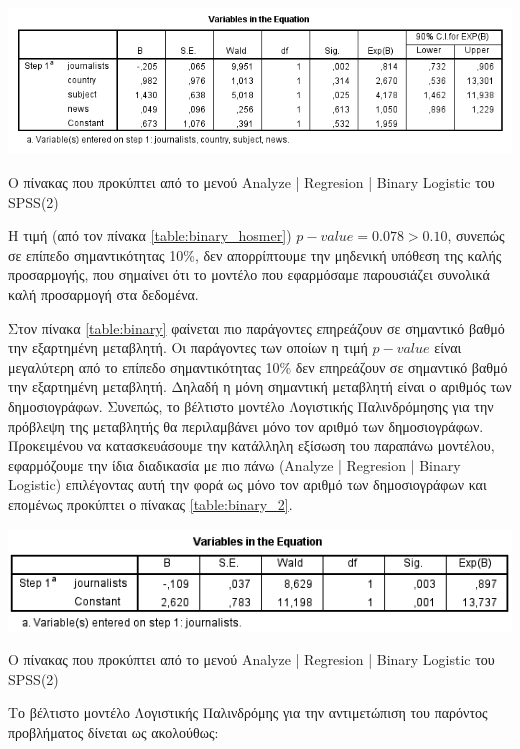 \documentclass{assignment}
\begin{document}
\begin{Assignment}[Μέρος Ε]
\begin{table}[htbp]
\includegraphics[width=\textwidth]{images/table_binary.png}
\caption{Ο πίνακας που προκύπτει από το μενού Analyze | Regresion | Binary Logistic του SPSS(2) }
\label{table:binary}
\end{table}

Η τιμή (από τον πίνακα \ref{table:binary_hosmer}) $p-value = 0.078 > 0.10$, συνεπώς σε επίπεδο σημαντικότητας 10\%, δεν απορρίπτουμε την μηδενική υπόθεση της καλής προσαρμογής, που σημαίνει ότι το μοντέλο που εφαρμόσαμε παρουσιάζει συνολικά καλή προσαρμογή στα δεδομένα.

Στον πίνακα \ref{table:binary} φαίνεται πιο παράγοντες επηρεάζουν σε σημαντικό βαθμό την εξαρτημένη μεταβλητή. Οι παράγοντες των οποίων η τιμή $p-value$ είναι μεγαλύτερη από το επίπεδο σημαντικότητας 10\% δεν επηρεάζουν σε σημαντικό βαθμό την εξαρτημένη μεταβλητή. Δηλαδή η μόνη σημαντική μεταβλητή είναι ο αριθμός των δημοσιογράφων.  Συνεπώς, το βέλτιστο μοντέλο Λογιστικής Παλινδρόμησης για την πρόβλεψη της μεταβλητής θα περιλαμβάνει μόνο τον αριθμό των δημοσιογράφων. Προκειμένου να κατασκευάσουμε την κατάλληλη εξίσωση του παραπάνω μοντέλου, εφαρμόζουμε την ίδια διαδικασία με πιο πάνω (Analyze | Regresion | Binary Logistic) επιλέγοντας αυτή την φορά ως  μόνο τον αριθμό των δημοσιογράφων και επομένως προκύπτει ο πίνακας \ref{table:binary_2}.

\begin{table}[htbp]
\includegraphics[width=\textwidth]{images/table_binary_2.png}
\caption{Ο πίνακας που προκύπτει από το μενού Analyze | Regresion | Binary Logistic του SPSS(2) }
\label{table:binary_2}
\end{table}

Το βέλτιστο μοντέλο Λογιστικής Παλινδρόμης για την αντιμετώπιση του παρόντος προβλήματος δίνεται ως ακολούθως:


\end{Assignment}
\end{document}
